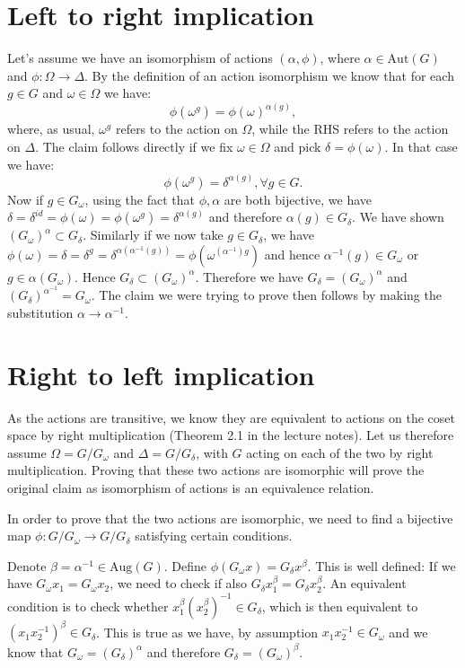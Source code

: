 \documentclass{article}
\begin{document}
\section*{Left to right implication}
Let's assume we have an isomorphism of actions $(\alpha, \phi)$, where $\alpha \in \mathrm{Aut}(G)$ and $\phi: \Omega \to \Delta$.
By the definition of an action isomorphism we know that for each $g \in G$ and $\omega \in \Omega$ we have:
\begin{equation*}
\phi(\omega^g) = \phi(\omega)^{\alpha(g)},
\end{equation*}
where, as usual, $\omega^g$ refers to the action on $\Omega$, while the RHS refers to the action on $\Delta$.
The claim follows directly if we fix $\omega \in \Omega$ and pick $\delta = \phi(\omega)$. In that case we have:
\begin{equation*}
\phi(\omega^g) = \delta^{\alpha(g)}, \forall g \in G.
\end{equation*}
Now if $g \in G_\omega$, using the fact that $\phi, \alpha$ are both bijective, we have $\delta = \delta^{id} = \phi(\omega) = \phi(\omega^g) = \delta^{\alpha(g)}$ and therefore $\alpha(g) \in G_\delta$. We have shown $(G_\omega)^\alpha \subset G_\delta$. 
Similarly if we now take $g \in G_\delta$, we have $\phi(\omega) = \delta = \delta^g = \delta^{\alpha (\alpha^{-1}(g))} = \phi(\omega^{(\alpha^{-1}) g})$ and hence $\alpha^{-1} (g) \in G_\omega$ or $g \in \alpha(G_\omega)$. Hence $G_\delta \subset (G_\omega)^\alpha$. Therefore we have $G_\delta = (G_\omega)^\alpha$ and $(G_\delta)^{\alpha^{-1}} = G_\omega$. The claim we were trying to prove then follows by making the substitution $\alpha \to \alpha^{-1}$.
\section*{Right to left implication}
As the actions are transitive, we know they are equivalent to actions on the coset space by right multiplication (Theorem 2.1 in the lecture notes). Let us therefore assume $\Omega = G/G_\omega$ and $\Delta = G/G_\delta$, with $G$ acting on each of the two by right multiplication. Proving that these two actions are isomorphic will prove the original claim as isomorphism of actions is an equivalence relation.


In order to prove that the two actions are isomorphic, we need to find a bijective map $\phi: G/G_\omega \to G/G_\delta$ satisfying certain conditions.

Denote $\beta = \alpha^{-1} \in \mathrm{Aug}(G)$. Define $\phi(G_\omega x) = G_\delta x^{\beta}$.
This is well defined: If we have $G_\omega x_1 = G_\omega x_2$, we need to check if also $G_\delta x_1^{\beta} = G_\delta x_2^{\beta}$. An equivalent condition is to check whether $x_1^{\beta} (x_2^{\beta})^{-1} \in G_\delta$, which is then equivalent to $(x_1 x_2^{-1})^\beta \in G_\delta$. This is true as we have, by assumption $x_1 x_2^{-1} \in G_\omega$ and we know that $G_\omega = (G_\delta)^\alpha$ and therefore $G_\delta = (G_\omega)^\beta$.
\end{document}
